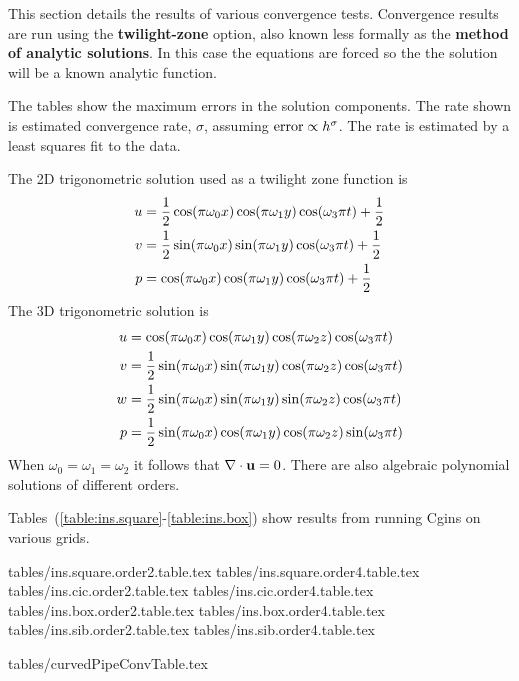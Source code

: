 \documentclass[10pt]{article}
\newcommand{\convDir}{tables}
\begin{document}
This section details the results of various convergence tests. 
Convergence results are run using the {\bf twilight-zone} option, also
known less formally as the {\bf method of analytic solutions}.
In this case the equations are forced so the the solution will
be a known analytic function.

The tables show the maximum errors in the solution components. The rate shown is estimated convergence rate, $\sigma$,
assuming ${\rm error} \propto h^\sigma$. The rate is estimated by a least squares fit to the data.

The 2D trigonometric solution used as a twilight zone function is
\begin{align*}
    u &= {1\over2} \cos(\pi \omega_0 x) \cos(\pi \omega_1 y) \cos( \omega_3 \pi t) + {1\over2}\\
    v &= {1\over2} \sin(\pi \omega_0 x) \sin(\pi \omega_1 y) \cos( \omega_3 \pi t) + {1\over2}\\
    p &=       \cos(\pi \omega_0 x) \cos(\pi \omega_1 y) \cos( \omega_3 \pi t)  + {1\over2}
\end{align*}
The 3D trigonometric solution is
\begin{align*}
    u &=       \cos(\pi \omega_0 x) \cos(\pi \omega_1 y) \cos(\pi \omega_2 z) \cos( \omega_3 \pi t) \\
    v &= {1\over2} \sin(\pi \omega_0 x) \sin(\pi \omega_1 y) \cos(\pi \omega_2 z) \cos( \omega_3 \pi t) \\
    w &= {1\over2} \sin(\pi \omega_0 x) \sin(\pi \omega_1 y) \sin(\pi \omega_2 z) \cos( \omega_3 \pi t) \\
    p &= {1\over2} \sin(\pi \omega_0 x) \cos(\pi \omega_1 y) \cos(\pi \omega_2 z) \sin( \omega_3 \pi t) 
\end{align*}
When $\omega_0=\omega_1=\omega_2$ it follows that $\nabla\cdot\mathbf{ u}=0$.
There are also algebraic polynomial solutions of different orders.


Tables~(\ref{table:ins.square}-\ref{table:ins.box}) show results from running Cgins on various
grids. 

 \convDir/ins.square.order2.table.tex
 \convDir/ins.square.order4.table.tex
 \convDir/ins.cic.order2.table.tex
 \convDir/ins.cic.order4.table.tex
 \convDir/ins.box.order2.table.tex
 \convDir/ins.box.order4.table.tex
 \convDir/ins.sib.order2.table.tex
 \convDir/ins.sib.order4.table.tex

 \convDir/curvedPipeConvTable.tex
\end{document}
